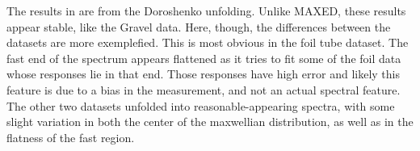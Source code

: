 The results in  are from the Doroshenko unfolding.
Unlike MAXED, these results appear stable, like the Gravel data.
Here, though, the differences between the datasets are more exemplefied.
This is most obvious in the foil tube dataset.
The fast end of the spectrum appears flattened as it tries to fit some of the foil data whose responses lie in that end.
Those responses have high error and likely this feature is due to a bias in the measurement, and not an actual spectral feature.
The other two datasets unfolded into reasonable-appearing spectra, with some slight variation in both the center of the maxwellian distribution, as well as in the flatness of the fast region.


